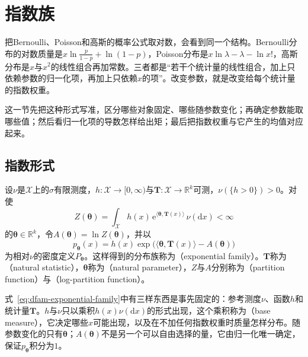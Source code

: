 \section{指数族}
\label{sec:dfam-exponential}

把Bernoulli、Poisson和高斯的概率公式取对数，会看到同一个结构。Bernoulli分布的对数质量是$x\ln\frac{p}{1-p}+\ln(1-p)$，Poisson分布是$x\ln\lambda-\lambda-\ln x!$，高斯分布是$x$与$x^{2}$的线性组合再加常数。三者都是“若干个统计量的线性组合，加上只依赖参数的归一化项，再加上只依赖$x$的项”。改变参数，就是改变给每个统计量的指数权重。

这一节先把这种形式写准，区分哪些对象固定、哪些随参数变化；再确定参数能取哪些值；然后看归一化项的导数怎样给出矩；最后把指数权重与它产生的均值对应起来。

\subsection{指数形式}
\label{sec:dfam-exponential-form}

\begin{definition}[指数族]
\label{def:dfam-exponential-family}
设$\nu$是$\mathcal{X}$上的$\sigma$有限测度，$h:\mathcal{X}\to[0,\infty)$与$\bm{T}:\mathcal{X}\to\mathbb{R}^{k}$可测，$\nu(\{h>0\})>0$。对使
\begin{equation}
  Z(\bm{\theta})=\int_{\mathcal{X}}h(x)\,\mathrm{e}^{\langle\bm{\theta},\bm{T}(x)\rangle}\,\nu(\mathrm{d}x)<\infty
  \label{eq:dfam-partition}
\end{equation}
的$\bm{\theta}\in\mathbb{R}^{k}$，令$A(\bm{\theta})=\ln Z(\bm{\theta})$，并以
\begin{equation}
  p_{\bm{\theta}}(x)=h(x)\exp\bigl(\langle\bm{\theta},\bm{T}(x)\rangle-A(\bm{\theta})\bigr)
  \label{eq:dfam-exponential-family}
\end{equation}
为相对$\nu$的密度定义$P_{\bm{\theta}}$。这样得到的分布族称为（exponential family）。$\bm{T}$称为（natural statistic），$\bm{\theta}$称为（natural parameter），$Z$与$A$分别称为（partition function）与（log-partition function）。
\end{definition}

式~\eqref{eq:dfam-exponential-family}中有三样东西是事先固定的：参考测度$\nu$、函数$h$和统计量$\bm{T}$。$h$与$\nu$只以乘积$h(x)\nu(\mathrm{d}x)$的形式出现，这个乘积称为（base measure），它决定哪些$x$可能出现，以及在不加任何指数权重时质量怎样分布。随参数变化的只有$\bm{\theta}$；$A(\bm{\theta})$不是另一个可以自由选择的量，它由归一化唯一确定，保证$p_{\bm{\theta}}$积分为$1$。

